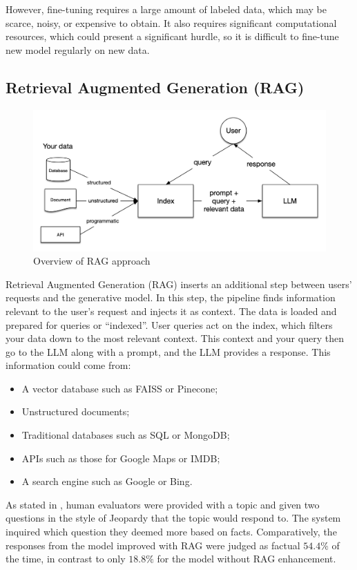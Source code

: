 \documentclass[conference, 11pt]{IEEEtran}
\begin{document}
However, fine-tuning requires a large amount of labeled data, which may be scarce, noisy, or expensive to obtain. It also requires significant computational resources, which could present a significant hurdle, so it is difficult to fine-tune new model regularly on new data.

\subsection{Retrieval Augmented Generation (RAG)}

\begin{figure}[h]
\centering
\includegraphics[width=1.0\linewidth]{basic_rag.png}
\caption{Overview of RAG approach \cite{llamaindex_rag}}
\end{figure}

Retrieval Augmented Generation (RAG) \cite{rag} inserts an additional step between users' requests and the generative model. In this step, the pipeline finds information relevant to the user's request and injects it as context. The data is loaded and prepared for queries or ``indexed''. User queries act on the index, which filters your data down to the most relevant context. This context and your query then go to the LLM along with a prompt, and the LLM provides a response. This information could come from:
\begin{itemize}
    \item A vector database such as FAISS \cite{faiss} or Pinecone;
    \item Unstructured documents;
    \item Traditional databases such as SQL or MongoDB;
    \item APIs such as those for Google Maps or IMDB;
    \item A search engine such as Google or Bing.
\end{itemize}

As stated in \cite{rag}, human evaluators were provided with a topic and given two questions in the style of Jeopardy that the topic would respond to. The system inquired which question they deemed more based on facts. Comparatively, the responses from the model improved with RAG were judged as factual $54.4\%$ of the time, in contrast to only $18.8\%$ for the model without RAG enhancement.
\end{document}
